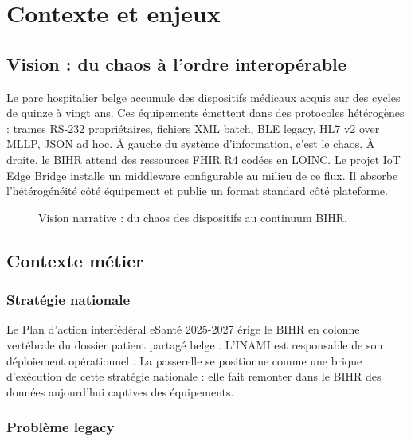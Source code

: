 \chapter{Contexte et enjeux}
\label{ch:contexte}

\section{Vision : du chaos à l'ordre interopérable}
\label{sec:vision}

Le parc hospitalier belge accumule des dispositifs médicaux acquis sur des cycles de quinze à vingt ans. Ces équipements émettent dans des protocoles hétérogènes : trames RS-232 propriétaires, fichiers XML batch, BLE legacy, HL7 v2 over MLLP, JSON ad hoc. À gauche du système d'information, c'est le chaos. À droite, le \gls{BIHR} attend des ressources \gls{FHIR} R4 codées en LOINC. Le projet IoT Edge Bridge installe un middleware configurable au milieu de ce flux. Il absorbe l'hétérogénéité côté équipement et publie un format standard côté plateforme.

\begin{figure}[h]
  \centering
  \resizebox{\linewidth}{!}{}
  \caption{Vision narrative : du chaos des dispositifs au continuum BIHR.}
  \label{fig:vision-chaos-ordre}
\end{figure}

\section{Contexte métier}
\label{sec:contexte-metier}

\subsection{Stratégie nationale}

Le Plan d'action interfédéral eSanté 2025-2027 érige le \gls{BIHR} en colonne vertébrale du dossier patient partagé belge \cite{plan_esante_2025_2027}. L'\gls{INAMI} est responsable de son déploiement opérationnel \cite{bihr_overview}. La passerelle se positionne comme une brique d'exécution de cette stratégie nationale : elle fait remonter dans le BIHR des données aujourd'hui captives des équipements.

\subsection{Problème legacy}

